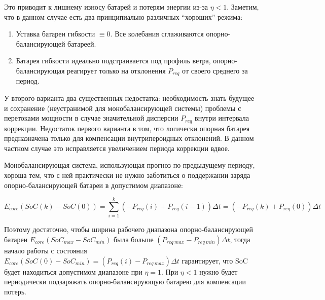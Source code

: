Это приводит к лишнему износу батарей и потерям энергии из-за $\eta < 1$.
Заметим, что в данном случае есть два принципиально различных ``хороших'' режима: 
\begin{enumerate}
    \item  Уставка батареи гибкости $\equiv  0$.
    Все колебания сглаживаются опорно-балансирующей батареей. 
    \item Батарея гибкости идеально подстраивается под профиль ветра, опорно-балансирующая реагирует только на отклонения $P_{req}$ от своего среднего за период.
\end{enumerate}

У второго варианта два существенных недостатка: 
необходимость знать будущее и сохранение (неустранимой для монобалансирующей системы) проблемы с перетоками мощности в случае значительной дисперсии $P_{req}$ внутри интервала коррекции.
Недостаток первого варианта в том, что логически опорная батарея предназначена только для компенсации внутрипероидных отклонений.
В данном частном случае это исправляется увеличением периода коррекции вдвое.

Монобалансирующая система, использующая прогноз по предыдущему периоду, хороша тем, что с ней практически не нужно заботиться о поддержании заряда опорно-балансирующей батареи в допустимом диапазоне:

\begin{equation}
    E_{core}(SoC(k) - SoC(0)) = \sum_{i=1}^k \left( -P_{req}(i) + P_{req}(i-1)\right) \Delta t = 
     \left( -P_{req}(k) + P_{req}(0) \right) \Delta t
\end{equation}

Поэтому достаточно, чтобы ширина рабочего диапазона опорно-балансирующей батареи $E_{core}(SoC_{max} - SoC_{min})$ была больше $\left(P_{req~max} - P_{req~min}\right)\Delta t$, тогда начало работы с состояния 
$E_{core}(SoC(0) - SoC_{min}) = \left(P_{req}(i) - P_{req~max}\right)\Delta t $ гарантирует, что SoC будет находиться допустимом диапазоне при $\eta = 1$.
При $\eta < 1$ нужно будет периодически подзаряжать опорно-балансирующую батарею для компенсации потерь.


